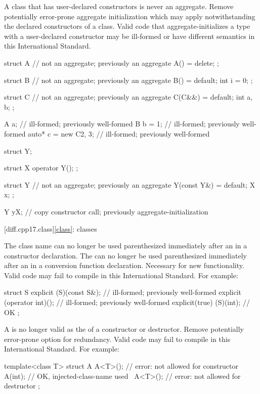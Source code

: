 \change
A class that has user-declared constructors is never an aggregate.
\rationale
Remove potentially error-prone aggregate initialization
which may apply notwithstanding the declared constructors of a class.
\effect
Valid \CppXVII{} code that aggregate-initializes
a type with a user-declared constructor
may be ill-formed or have different semantics
in this International Standard.
\begin{codeblock}
struct A {              // not an aggregate; previously an aggregate
  A() = delete;
};

struct B {              // not an aggregate; previously an aggregate
  B() = default;
  int i = 0;
};

struct C {              // not an aggregate; previously an aggregate
  C(C&&) = default;
  int a, b;
};

A a{};                  // ill-formed; previously well-formed
B b = {1};              // ill-formed; previously well-formed
auto* c = new C{2, 3};  // ill-formed; previously well-formed

struct Y;

struct X {
  operator Y();
};

struct Y {              // not an aggregate; previously an aggregate
  Y(const Y&) = default;
  X x;
};

Y y{X{}};               // copy constructor call; previously aggregate-initialization
\end{codeblock}

[diff.cpp17.class]{\ref{class}: classes}

\change
The class name can no longer be used parenthesized
immediately after an  
in a constructor declaration.
The  can no longer be used parenthesized
immediately after an  
in a conversion function declaration.
\rationale
Necessary for new functionality.
\effect
Valid \CppXVII{} code may fail to compile
in this International Standard. For example:
\begin{codeblock}
struct S {
  explicit (S)(const S&);       // ill-formed; previously well-formed
  explicit (operator int)();    // ill-formed; previously well-formed
  explicit(true) (S)(int);      // OK
};
\end{codeblock}

\change
A 
is no longer valid as the  of a constructor or destructor.
\rationale
Remove potentially error-prone option for redundancy.
\effect
Valid \CppXVII{} code may fail to compile
in this International Standard. For example:
\begin{codeblock}
template<class T>
struct A {
  A<T>();          // error:  not allowed for constructor
  A(int);          // OK, injected-class-name used
  ~A<T>();         // error:  not allowed for destructor
};
\end{codeblock}

